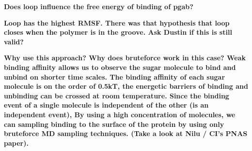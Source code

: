 \textbf{Does loop influence the free energy of binding of pgab?}

\textbf{Loop has the highest RMSF.  There was that hypothesis that loop closes when the polymer is in the groove.  Ask Dustin if this is still valid?}

\textbf{Why use this approach?  Why does bruteforce work in this case? Weak binding affinity allows us to observe the sugar molecule to bind and unbind on shorter time scales.  The binding affinity of each sugar molecule is on the order of 0.5kT, the energetic barriers of binding and unbinding can be crossed at room temperature.   Since the binding event of a single molecule is independent of the other (is an independent event), By using a high concentration of molecules, we can sampling binding to the surface of the protein by using only bruteforce MD sampling techniques. (Take a look at Nilu / CI's PNAS paper).}




